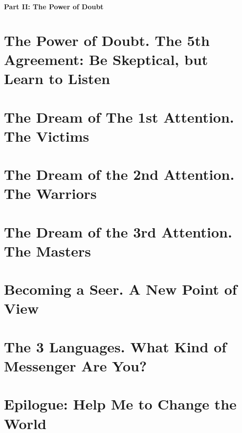\documentclass{article}
\numberwithin{equation}{section}
\begin{document}
\begin{center}\Large\bf
	Part II: The Power of Doubt
\end{center}

\section{The Power of Doubt. The 5th Agreement: Be Skeptical, but Learn to Listen}


\section{The Dream of The 1st Attention. The Victims}


\section{The Dream of the 2nd Attention. The Warriors}


\section{The Dream of the 3rd Attention. The Masters}


\section{Becoming a Seer. A New Point of View}


\section{The 3 Languages. What Kind of Messenger Are You?}


\section{Epilogue: Help Me to Change the World}


\printbibliography[heading=bibintoc]
	
\end{document}

